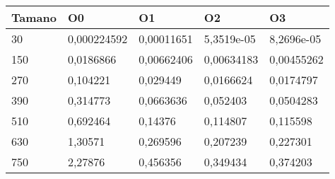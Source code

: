\begin{tabular}{|l|l|l|l|l|}
	\hline
	Tamano & O0 & O1 & O2 & O3 \\
	\hline
	\hline
	30 & 0,000224592 & 0,00011651 & 5,3519e-05 & 8,2696e-05 \\
	\hline
	150 & 0,0186866 & 0,00662406 & 0,00634183 & 0,00455262 \\
	\hline
	270 & 0,104221 & 0,029449 & 0,0166624 & 0,0174797 \\
	\hline
	390 & 0,314773 & 0,0663636 & 0,052403 & 0,0504283 \\
	\hline
	510 & 0,692464 & 0,14376 & 0,114807 & 0,115598 \\
	\hline
	630 & 1,30571 & 0,269596 & 0,207239 & 0,227301 \\
	\hline
	750 & 2,27876 & 0,456356 & 0,349434 & 0,374203 \\
	\hline
\end{tabular}
